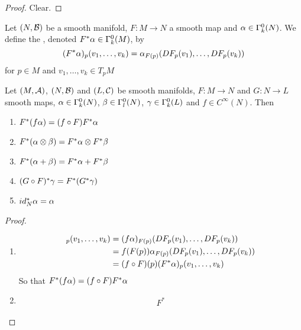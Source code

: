 \documentclass{book}
\begin{document}
	\begin{proof}
	Clear.
	\end{proof}
	
	\begin{defn}
	Let $(N, \mathcal{B})$ be a smooth manifold, $F:M \rightarrow N$ a smooth map and $\alpha \in \Gamma^0_k(N)$. We define the , denoted $F^*\alpha \in \Gamma^0_k(M)$, by  $$(F^*\alpha)_p(v_1, \dots, v_k) = \alpha_{F(p)} (DF_p(v_1), \dots, DF_p(v_k))$$ for $p \in M$ and $v_1, \dots, v_k \in T_pM$
	\end{defn}

	\begin{ex}
	Let $(M, \mathcal{A})$, $(N, \mathcal{B})$ and $(L, \mathcal{C})$ be smooth manifolds, $F:M \rightarrow N$ and $G:N \rightarrow L$ smooth maps, $\alpha \in \Gamma^0_k(N)$, $\beta  \in \Gamma^0_l(N)$, $\gamma \in \Gamma^0_k(L)$ and $f \in C^{\infty}(N)$. Then 
	\begin{enumerate}
	\item $F^*(f \alpha) = (f \circ F) F^* \alpha$
	\item $F^*(\alpha \otimes \beta) = F^*\alpha \otimes F^* \beta$
	\item $F^*(\alpha + \beta) = F^* \alpha + F^* \beta $
	\item $(G \circ F)^*\gamma = F^*(G^* \gamma)$
	\item $id_N^* \alpha = \alpha$
	\end{enumerate}
	\end{ex}
	
	\begin{proof}\
	\begin{enumerate}
	\item 
	\begin{align*}
	[F^*(f \al)]_p(v_1, \dots, v_k) 
	&= (f \al )_{F(p)}(DF_p(v_1), \dots, DF_p(v_k)) \\
	&= f (F(p)) \al_{F(p)} (DF_p(v_1), \dots, DF_p(v_k)) \\
	&= (f \circ F)(p) (F^*\al)_p(v_1, \dots, v_k)
	\end{align*}
	So that $F^*(f \alpha) = (f \circ F) F^* \alpha$
	\item 
	\begin{align*}
		F^*
	\end{align*}
	\end{enumerate}
	
	\end{proof}
	
	
	
	
	
	\begin{defn}
	
	\end{defn}
\end{document}

